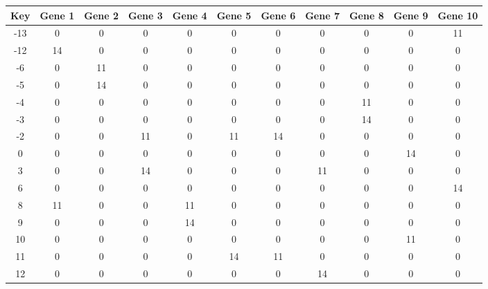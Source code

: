\begin{tabular}{|c|c|c|c|c|c|c|c|c|c|c|}
\hline
Key & Gene 1 & Gene 2 & Gene 3 & Gene 4 & Gene 5 & Gene 6 & Gene 7 & Gene 8 & Gene 9 & Gene 10 \\
\hline
-13 & 0 & 0 & 0 & 0 & 0 & 0 & 0 & 0 & 0 & 11 \\
-12 & 14 & 0 & 0 & 0 & 0 & 0 & 0 & 0 & 0 & 0 \\
-6 & 0 & 11 & 0 & 0 & 0 & 0 & 0 & 0 & 0 & 0 \\
-5 & 0 & 14 & 0 & 0 & 0 & 0 & 0 & 0 & 0 & 0 \\
-4 & 0 & 0 & 0 & 0 & 0 & 0 & 0 & 11 & 0 & 0 \\
-3 & 0 & 0 & 0 & 0 & 0 & 0 & 0 & 14 & 0 & 0 \\
-2 & 0 & 0 & 11 & 0 & 11 & 14 & 0 & 0 & 0 & 0 \\
0 & 0 & 0 & 0 & 0 & 0 & 0 & 0 & 0 & 14 & 0 \\
3 & 0 & 0 & 14 & 0 & 0 & 0 & 11 & 0 & 0 & 0 \\
6 & 0 & 0 & 0 & 0 & 0 & 0 & 0 & 0 & 0 & 14 \\
8 & 11 & 0 & 0 & 11 & 0 & 0 & 0 & 0 & 0 & 0 \\
9 & 0 & 0 & 0 & 14 & 0 & 0 & 0 & 0 & 0 & 0 \\
10 & 0 & 0 & 0 & 0 & 0 & 0 & 0 & 0 & 11 & 0 \\
11 & 0 & 0 & 0 & 0 & 14 & 11 & 0 & 0 & 0 & 0 \\
12 & 0 & 0 & 0 & 0 & 0 & 0 & 14 & 0 & 0 & 0 \\
\hline
\end{tabular}